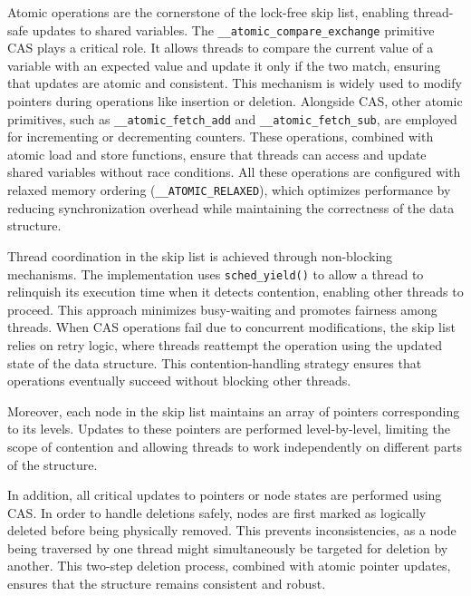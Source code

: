 \documentclass{article}
\begin{document}
Atomic operations are the cornerstone of the lock-free skip list, enabling thread-safe updates to shared variables. The \texttt{\_\_atomic\_compare\_exchange} primitive CAS plays a critical role. It allows threads to compare the current value of a variable with an expected value and update it only if the two match, ensuring that updates are atomic and consistent. This mechanism is widely used to modify pointers during operations like insertion or deletion. Alongside CAS, other atomic primitives, such as \texttt{\_\_atomic\_fetch\_add} and \texttt{\_\_atomic\_fetch\_sub}, are employed for incrementing or decrementing counters. These operations, combined with atomic load and store functions, ensure that threads can access and update shared variables without race conditions. All these operations are configured with relaxed memory ordering (\texttt{\_\_ATOMIC\_RELAXED}), which optimizes performance by reducing synchronization overhead while maintaining the correctness of the data structure.

Thread coordination in the skip list is achieved through non-blocking mechanisms. The implementation uses \texttt{sched\_yield()} to allow a thread to relinquish its execution time when it detects contention, enabling other threads to proceed. This approach minimizes busy-waiting and promotes fairness among threads. When CAS operations fail due to concurrent modifications, the skip list relies on retry logic, where threads reattempt the operation using the updated state of the data structure. This contention-handling strategy ensures that operations eventually succeed without blocking other threads.

Moreover, each node in the skip list maintains an array of pointers corresponding to its levels. Updates to these pointers are performed level-by-level, limiting the scope of contention and allowing threads to work independently on different parts of the structure. 

In addition, all critical updates to pointers or node states are performed using CAS. In order to handle deletions safely, nodes are first marked as logically deleted before being physically removed. This prevents inconsistencies, as a node being traversed by one thread might simultaneously be targeted for deletion by another. This two-step deletion process, combined with atomic pointer updates, ensures that the structure remains consistent and robust.

\newpage
\end{document}
